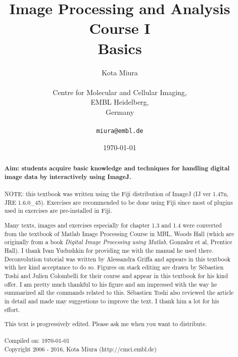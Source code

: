\title{Image Processing and Analysis Course I\\
Basics}
\author{Kota Miura\\
\\
  Centre for Molecular and Cellular Imaging,\\
  EMBL Heidelberg,\\
  Germany\\
\\
\texttt{miura@embl.de}
}

\date{\today}

\pagestyle{empty}
\titleTH
\clearpage
\pagestyle{fancyplain}
\begin{abstract}
\HRule

\textbf{Aim: students acquire basic knowledge and techniques for handling
digital image data by interactively using ImageJ.} \\
\\

NOTE: this textbook was written using the Fiji distribution of ImageJ (IJ ver 1.47n, JRE 1.6.0\_45).
Exercises are recommended to be done using Fiji since most of plugins used in
exercises are pre-installed in Fiji.

Many texts, images and exercises especially for chapter 1.3 and 1.4 were
converted from the textbook of Matlab Image Processing Course in MBL, Woods Hall
(which are originally from a book \textit{Digital Image Processing
using Matlab}, Gonzalez et al, Prentice Hall). I thank Ivan Yudushkin for
providing me with the manual he used there.
Deconvolution tutorial was written by Alessandra Griffa and appears in this
textbook with her kind acceptance to do so.
Figures on stack editing are drawn by S\'{e}bastien Toshi and Julien Colombelli for their course and appear in this textbook for his kind offer. I am pretty much thankful to his figure and am impressed with the way he summarized all the commands related to this.
S\'{e}bastien Toshi also reviewed the article in detail and made may suggestions to improve the text. I thank him a lot for his effort. 


This text is progressively edited. Please ask me when you want to distribute. \\
\\
Compiled on: \today \\
Copyright 2006 - 2016, Kota Miura (http://cmci.embl.de)

\HRule
\end{abstract}
